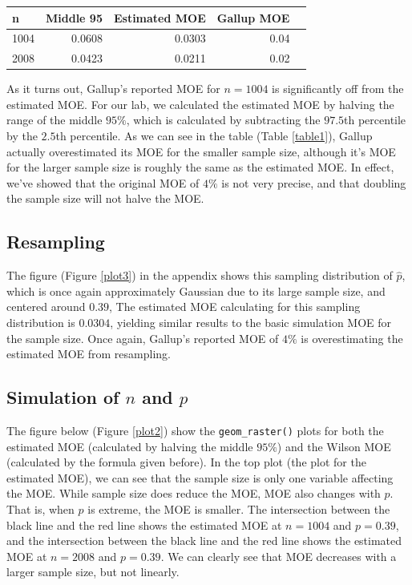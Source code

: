 \documentclass{article}\usepackage[]{graphicx}\usepackage[]{xcolor}
\newenvironment{Figure}
  {\par\medskip\noindent\minipage{\linewidth}}
  {\endminipage\par\medskip}
\begin{document}
\begin{multicols}{2}
\begin{Figure}
\centering
\begin{tabular}{lrrrr}
  \hline
n & Middle 95 & Estimated MOE & Gallup MOE \\ 
  \hline
1004 & 0.0608 & 0.0303 & 0.04 \\ 
  2008 & 0.0423 & 0.0211 & 0.02 \\ 
   \hline
\end{tabular}
\label{table1}
\end{Figure}

As it turns out, Gallup's reported MOE for $n=1004$ is significantly off from the estimated MOE. For our lab, we calculated the estimated MOE by halving the range of the middle $95\%$, which is calculated by subtracting the $97.5$th percentile by the $2.5$th percentile. As we can see in the table (Table \ref{table1}), Gallup actually overestimated its MOE for the smaller sample size, although it's MOE for the larger sample size is roughly the same as the estimated MOE. In effect, we've showed that the original MOE of $4\%$ is not very precise, and that doubling the sample size will not halve the MOE.

\subsection{Resampling}
The figure (Figure \ref{plot3}) in the appendix shows this sampling distribution of $\hat{p}$, which is once again approximately Gaussian due to its large sample size, and centered around $0.39$, The estimated MOE calculating for this sampling distribution is $0.0304$, yielding similar results to the basic simulation MOE for the sample size. Once again, Gallup's reported MOE of $4\%$ is overestimating the estimated MOE from resampling. 

\subsection{Simulation of $n$ and $p$}
The figure below (Figure \ref{plot2}) show the \verb|geom_raster()| plots for both the estimated MOE (calculated by halving the middle $95\%$) and the Wilson MOE (calculated by the formula given before). In the top plot (the plot for the estimated MOE), we can see that the sample size is only one variable affecting the MOE. While sample size does reduce the MOE, MOE also changes with $p$. That is, when $p$ is extreme, the MOE is smaller. The intersection between the black line and the red line shows the estimated MOE at $n=1004$ and $p=0.39$, and the intersection between the black line and the red line shows the estimated MOE at $n=2008$ and $p=0.39$. We can clearly see that MOE decreases with a larger sample size, but not linearly. 

\end{multicols}
\end{document}
